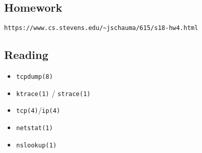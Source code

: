 \documentclass[xga]{xdvislides}
\begin{document}
\subsection{Homework}

\verb+https://www.cs.stevens.edu/~jschauma/615/s18-hw4.html+


\subsection{Reading}
\begin{itemize}
	\item \verb+tcpdump(8)+
	\item \verb+ktrace(1)+ / \verb+strace(1)+
	\item \verb+tcp(4)+/\verb+ip(4)+
	\item \verb+netstat(1)+
	\item \verb+nslookup(1)+
\end{itemize}
\end{document}
